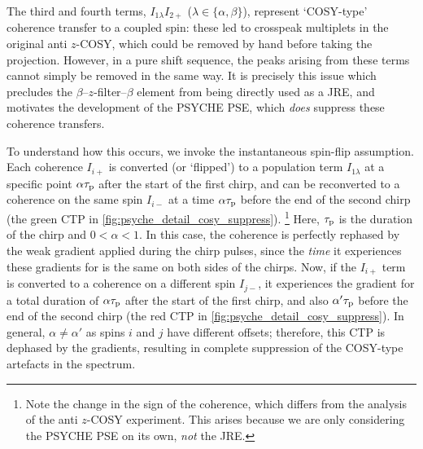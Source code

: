 The third and fourth terms, $I_{1\lambda}I_{2+}$ ($\lambda \in \{\alpha,\beta\}$), represent `COSY-type' coherence transfer to a coupled spin: these led to crosspeak multiplets in the original anti $z$-COSY, which could be removed by hand before taking the projection.
However, in a pure shift sequence, the peaks arising from these terms cannot simply be removed in the same way.
It is precisely this issue which precludes the $\beta$--$z$-filter--$\beta$ element from being directly used as a JRE, and motivates the development of the PSYCHE PSE, which \textit{does} suppress these coherence transfers.

To understand how this occurs, we invoke the instantaneous spin-flip assumption.
Each coherence $I_{i+}$ is converted (or `flipped') to a population term $I_{1\lambda}$ at a specific point $\alpha\tau_\mathrm{p}$ after the start of the first chirp, and can be reconverted to a coherence on the same spin $I_{i-}$ at a time $\alpha\tau_\mathrm{p}$ before the end of the second chirp (the green CTP in \cref{fig:psyche_detail_cosy_suppress}).%
\footnote{Note the change in the sign of the coherence, which differs from the analysis of the anti $z$-COSY experiment. This arises because we are only considering the PSYCHE PSE on its own, \textit{not} the JRE.}
Here, $\tau_\mathrm{p}$ is the duration of the chirp and $0 < \alpha < 1$.
In this case, the coherence is perfectly rephased by the weak gradient applied during the chirp pulses, since the \textit{time} it experiences these gradients for is the same on both sides of the chirps.
Now, if the $I_{i+}$ term is converted to a coherence on a different spin $I_{j-}$, it experiences the gradient for a total duration of $\alpha\tau_\mathrm{p}$ after the start of the first chirp, and also $\alpha'\tau_\mathrm{p}$ before the end of the second chirp (the red CTP in \cref{fig:psyche_detail_cosy_suppress}).
In general, $\alpha \neq \alpha'$ as spins $i$ and $j$ have different offsets; therefore, this CTP is dephased by the gradients, resulting in complete suppression of the COSY-type artefacts in the spectrum.

